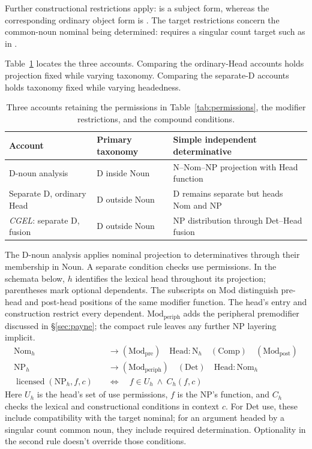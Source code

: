 \documentclass[12pt]{article}
\begin{document}
Further constructional restrictions apply:  is a subject form, whereas the corresponding ordinary object form is . The target restrictions concern the common-noun nominal being determined:  requires a singular count target such as  in .

Table~\ref{tab:economy} locates the three accounts. Comparing the ordinary-Head accounts holds projection fixed while varying taxonomy. Comparing the separate-D accounts holds taxonomy fixed while varying headedness.

\begin{table}[H]
\centering\small
\caption{Three accounts retaining the permissions in Table~\ref{tab:permissions}, the modifier restrictions, and the compound conditions.}\label{tab:economy}
\begin{tabular}{>{\raggedright\arraybackslash}p{3.1cm}>{\raggedright\arraybackslash}p{3.9cm}>{\raggedright\arraybackslash}p{4.7cm}}
\toprule
Account & Primary taxonomy & Simple independent determinative \\
\midrule
D-noun analysis & D inside Noun & N--Nom--NP projection with Head function \\
Separate D, ordinary Head & D outside Noun & D remains separate but heads Nom and NP \\
\textit{CGEL}: separate D, fusion & D outside Noun & NP distribution through Det--Head fusion \\
\bottomrule
\end{tabular}
\end{table}

The D-noun analysis applies nominal projection to determinatives through their membership in Noun. A separate condition checks use permissions. In the schemata below, $h$ identifies the lexical head throughout its projection; parentheses mark optional dependents. The subscripts on Mod distinguish pre-head and post-head positions of the same modifier function. The head's entry and construction restrict every dependent. $\mathrm{Mod}_{\mathrm{periph}}$ adds the peripheral premodifier discussed in §\ref{sec:payne}; the compact rule leaves any further NP layering implicit.
\[
\begin{aligned}
\mathrm{Nom}_{h} &\to (\mathrm{Mod}_{\mathrm{pre}})\quad \mathrm{Head}:\mathrm{N}_{h}\quad (\mathrm{Comp})\quad (\mathrm{Mod}_{\mathrm{post}}) \\
\mathrm{NP}_{h} &\to (\mathrm{Mod}_{\mathrm{periph}})\quad (\mathrm{Det})\quad \mathrm{Head}:\mathrm{Nom}_{h} \\
\operatorname{licensed}(\mathrm{NP}_{h},f,c)\quad &\Longleftrightarrow\quad f\in U_h\ \land\ C_h(f,c)
\end{aligned}
\]
Here $U_h$ is the head's set of use permissions, $f$ is the NP's function, and $C_h$ checks the lexical and constructional conditions in context $c$. For Det use, these include compatibility with the target nominal; for an argument headed by a singular count common noun, they include required determination. Optionality in the second rule doesn't override those conditions.
\end{document}
